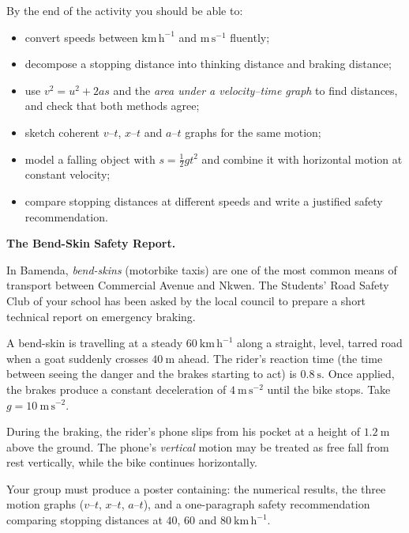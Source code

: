 \documentclass[11pt]{article}
\newcommand{\cle}[1]{{\popxbold\color{popdark}#1}}
\newcounter{popsec}
\newcounter{popsub}
\newcommand{\courssub}[1]{%
  \stepcounter{popsub}%
  \par\vspace{9pt}\noindent{\popxbold\fontsize{11.5}{13}\selectfont\color{popink}{\color{poporange}\thepopsec.\thepopsub}\hspace{6pt}#1}\par\nopagebreak\vspace{4pt}
}
\begin{document}
By the end of the activity you should be able to:
\begin{itemize}
\item convert speeds between $\mathrm{km\,h^{-1}}$ and $\mathrm{m\,s^{-1}}$ fluently;
\item decompose a stopping distance into \cle{thinking distance} and \cle{braking distance};
\item use $v^2 = u^2 + 2as$ and the \emph{area under a velocity--time graph} to find distances, and check that both methods agree;
\item sketch coherent $v$--$t$, $x$--$t$ and $a$--$t$ graphs for the same motion;
\item model a falling object with $s = \tfrac{1}{2}gt^2$ and combine it with horizontal motion at constant velocity;
\item compare stopping distances at different speeds and write a justified safety recommendation.
\end{itemize}

\courssub{Situation}

\textbf{The Bend-Skin Safety Report.}\par
In Bamenda, \emph{bend-skins} (motorbike taxis) are one of the most common means of transport between Commercial Avenue and Nkwen. The Students' Road Safety Club of your school has been asked by the local council to prepare a short technical report on emergency braking.

A bend-skin is travelling at a steady $60\ \mathrm{km\,h^{-1}}$ along a straight, level, tarred road when a goat suddenly crosses $40\ \mathrm{m}$ ahead. The rider's \cle{reaction time} (the time between seeing the danger and the brakes starting to act) is $0.8\ \mathrm{s}$. Once applied, the brakes produce a constant deceleration of $4\ \mathrm{m\,s^{-2}}$ until the bike stops. Take $g = 10\ \mathrm{m\,s^{-2}}$.

During the braking, the rider's phone slips from his pocket at a height of $1.2\ \mathrm{m}$ above the ground. The phone's \emph{vertical} motion may be treated as free fall from rest vertically, while the bike continues horizontally.

Your group must produce a poster containing: the numerical results, the three motion graphs ($v$--$t$, $x$--$t$, $a$--$t$), and a one-paragraph safety recommendation comparing stopping distances at $40$, $60$ and $80\ \mathrm{km\,h^{-1}}$.

\courssub{Tasks}
\end{document}
